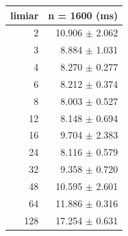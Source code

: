 \begin{tabular}{rr}
\hline
limiar & n = 1600 (ms) \\
\hline
2 & 10.906 $\pm$ 2.062 \\
3 & 8.884 $\pm$ 1.031 \\
4 & 8.270 $\pm$ 0.277 \\
6 & 8.212 $\pm$ 0.374 \\
8 & 8.003 $\pm$ 0.527 \\
12 & 8.148 $\pm$ 0.694 \\
16 & 9.704 $\pm$ 2.383 \\
24 & 8.116 $\pm$ 0.579 \\
32 & 9.358 $\pm$ 0.720 \\
48 & 10.595 $\pm$ 2.601 \\
64 & 11.886 $\pm$ 0.316 \\
128 & 17.254 $\pm$ 0.631 \\
\hline
\end{tabular}
